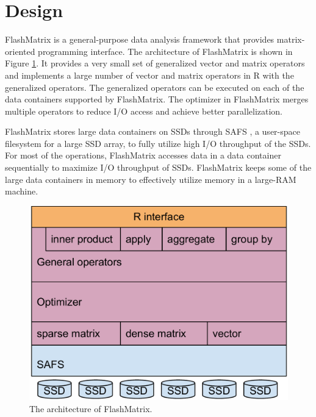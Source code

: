 \section{Design}

FlashMatrix is a general-purpose data analysis framework that provides
matrix-oriented programming interface. The architecture of FlashMatrix
is shown in Figure \ref{fig:arch}. It provides a very small set of
generalized vector and matrix operators and implements a large number of
vector and matrix operators in R with the generalized operators. The generalized
operators can be executed on each of the data containers supported by
FlashMatrix. The optimizer in FlashMatrix merges multiple operators to
reduce I/O access and achieve better parallelization.

FlashMatrix stores large data containers on SSDs through SAFS \cite{safs},
a user-space filesystem for a large SSD array, to fully utilize high I/O
throughput of the SSDs. For most of the operations, FlashMatrix accesses
data in a data container sequentially to maximize I/O throughput of SSDs.
FlashMatrix keeps some of the large data containers in memory to effectively
utilize memory in a large-RAM machine.

\begin{figure}
\centering
\includegraphics[scale=0.3]{./architecture.pdf}
\vspace{-5pt}
\caption{The architecture of FlashMatrix.}
\vspace{-5pt}
\label{fig:arch}
\end{figure}

